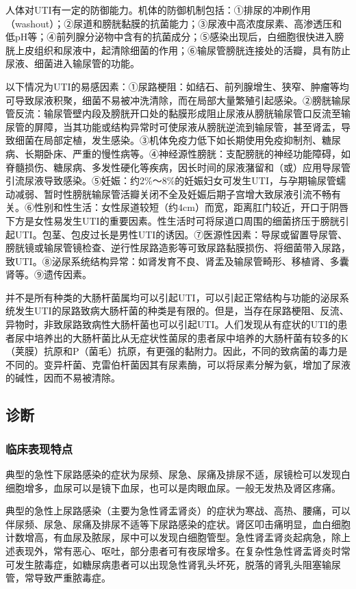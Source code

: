 人体对UTI有一定的防御能力。机体的防御机制包括：①排尿的冲刷作用（washout）；②尿道和膀胱黏膜的抗菌能力；③尿液中高浓度尿素、高渗透压和低pH等；④前列腺分泌物中含有的抗菌成分；⑤感染出现后，白细胞很快进入膀胱上皮组织和尿液中，起清除细菌的作用；⑥输尿管膀胱连接处的活瓣，具有防止尿液、细菌进入输尿管的功能。

以下情况为UTI的易感因素：①尿路梗阻：如结石、前列腺增生、狭窄、肿瘤等均可导致尿液积聚，细菌不易被冲洗清除，而在局部大量繁殖引起感染。②膀胱输尿管反流：输尿管壁内段及膀胱开口处的黏膜形成阻止尿液从膀胱输尿管口反流至输尿管的屏障，当其功能或结构异常时可使尿液从膀胱逆流到输尿管，甚至肾盂，导致细菌在局部定植，发生感染。③机体免疫力低下如长期使用免疫抑制剂、糖尿病、长期卧床、严重的慢性病等。④神经源性膀胱：支配膀胱的神经功能障碍，如脊髓损伤、糖尿病、多发性硬化等疾病，因长时间的尿液潴留和（或）应用导尿管引流尿液导致感染。⑤妊娠：约2\%～8\%的妊娠妇女可发生UTI，与孕期输尿管蠕动减弱、暂时性膀胱输尿管活瓣关闭不全及妊娠后期子宫增大致尿液引流不畅有关。⑥性别和性生活：女性尿道较短（约4cm）而宽，距离肛门较近，开口于阴唇下方是女性易发生UTI的重要因素。性生活时可将尿道口周围的细菌挤压于膀胱引起UTI。包茎、包皮过长是男性UTI的诱因。⑦医源性因素：导尿或留置导尿管、膀胱镜或输尿管镜检查、逆行性尿路造影等可致尿路黏膜损伤、将细菌带入尿路，致UTI。⑧泌尿系统结构异常：如肾发育不良、肾盂及输尿管畸形、移植肾、多囊肾等。⑨遗传因素。

并不是所有种类的大肠杆菌属均可以引起UTI，可以引起正常结构与功能的泌尿系统发生UTI的尿路致病大肠杆菌的种类是有限的。但是，当存在尿路梗阻、反流、异物时，非致尿路致病性大肠杆菌也可以引起UTI。人们发现从有症状的UTI的患者尿中培养出的大肠杆菌比从无症状性菌尿的患者尿中培养的大肠杆菌有较多的K（荚膜）抗原和P（菌毛）抗原，有更强的黏附力。因此，不同的致病菌的毒力是不同的。变异杆菌、克雷伯杆菌因其有尿素酶，可以将尿素分解为氨，增加了尿液的碱性，因而不易被清除。

\subsection{诊断}

\subsubsection{临床表现特点}

典型的急性下尿路感染的症状为尿频、尿急、尿痛及排尿不适，尿镜检可以发现白细胞增多，血尿可以是镜下血尿，也可以是肉眼血尿。一般无发热及肾区疼痛。

典型的急性上尿路感染（主要为急性肾盂肾炎）的症状为寒战、高热、腰痛，可以伴尿频、尿急、尿痛及排尿不适等下尿路感染的症状。肾区叩击痛明显，血白细胞计数增高，有血尿及脓尿，尿中可以发现白细胞管型。急性肾盂肾炎起病急，除上述表现外，常有恶心、呕吐，部分患者可有夜尿增多。在复杂性急性肾盂肾炎时常可发生脓毒症，如糖尿病患者可以出现急性肾乳头坏死，脱落的肾乳头阻塞输尿管，常导致严重脓毒症。

